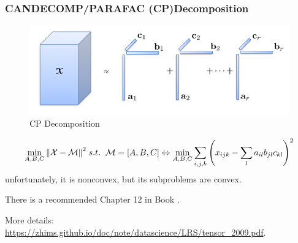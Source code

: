 \documentclass[aspectratio=2516]{beamer}
\begin{document}

\begin{frame}
\frametitle{CANDECOMP/PARAFAC (CP)Decomposition}
\begin{figure}
	\centering
	\includegraphics[width=0.4\linewidth,height=0.15\linewidth]{fig5.png}
	\caption{CP Decomposition}
	\label{fig5} 
\end{figure}
\begin{equation}
\mathop {\min }\limits_{A,B,C} {\left\| {\mathcal{X} - \mathcal{M}} \right\|^2}\;s.t.\;\;\mathcal{M} = \left[{A,B,C} 
\right] \Leftrightarrow \mathop {\min }\limits_{A,B,C} {\sum\limits_{i,j,k} {\left( {{x_{ijk}} - \sum\limits_l {{a_{il}}{b_{jl}}{c_{kl}}} } \right)} ^2}
\notag 
\end{equation}
unfortunately, it is nonconvex, but its subproblems are convex.

\vspace{0.25cm}

{\tiny There is a recommended Chapter 12 in Book {\color{blue} \cite{p4}}}.

\vspace{0.25cm}

{\tiny More details:} {\color{blue} \tiny \url{https://zhims.github.io/doc/note/datascience/LRS/tensor_2009.pdf}}. 

\end{frame}
\end{document}
